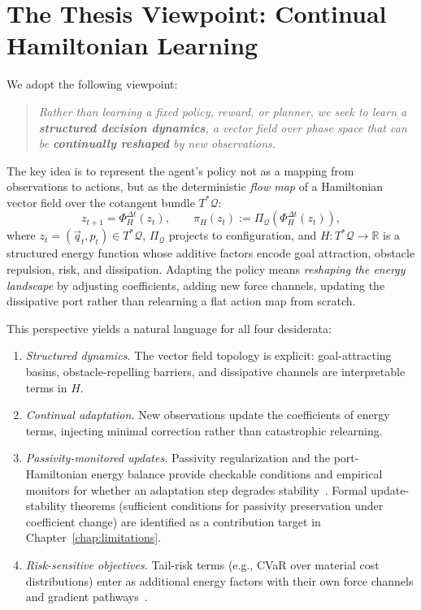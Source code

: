 \section{The Thesis Viewpoint: Continual Hamiltonian Learning}
\label{sec:intro:viewpoint}

We adopt the following viewpoint:
\begin{quote}
\itshape
Rather than learning a fixed policy, reward, or planner, we seek to learn
a \textbf{structured decision dynamics}, a vector field over phase space that
can be \textbf{continually reshaped} by new observations.
\end{quote}
The key idea is to represent the agent's policy not as a mapping from
observations to actions, but as the deterministic \emph{flow map} of a
Hamiltonian vector field over the cotangent bundle $T^*\mathcal{Q}$:
\begin{equation}
  z_{t+1} = \Phi^{\Delta t}_{H}(z_t),
  \qquad
  \pi_H(z_t) := \Pi_{\mathcal{Q}}\!\left(\Phi^{\Delta t}_H(z_t)\right),
  \label{eq:intro:policy_as_flow}
\end{equation}
where $z_t = (\vec{q}_t, p_t) \in T^*\mathcal{Q}$,
$\Pi_{\mathcal{Q}}$ projects to configuration, and
$H : T^*\mathcal{Q} \to \mathbb{R}$ is a structured energy function
whose additive factors encode goal attraction, obstacle repulsion, risk, and dissipation.
Adapting the policy means \emph{reshaping the energy landscape} by adjusting
coefficients, adding new force channels, updating the dissipative port rather
than relearning a flat action map from scratch.

This perspective yields a natural language for all four desiderata:
\begin{enumerate}
  \item \emph{Structured dynamics.}
        The vector field topology is explicit: goal-attracting basins,
        obstacle-repelling barriers, and dissipative channels are
        interpretable terms in $H$.
  \item \emph{Continual adaptation.}
        New observations update the coefficients of energy terms, injecting
        minimal correction rather than catastrophic relearning.
  \item \emph{Passivity-monitored updates.}
        Passivity regularization and the port-Hamiltonian energy balance provide
        checkable conditions and empirical monitors for whether an adaptation
        step degrades stability~\citep{desai2021porthamiltonian,roth2025stable}.
        Formal update-stability theorems (sufficient conditions for
        passivity preservation under coefficient change) are identified
        as a contribution target in Chapter~\ref{chap:limitations}.
  \item \emph{Risk-sensitive objectives.}
        Tail-risk terms (e.g., CVaR over material cost distributions)
        enter as additional energy factors with their own force channels and
        gradient pathways~\citep{chow2015risk}.
\end{enumerate}

